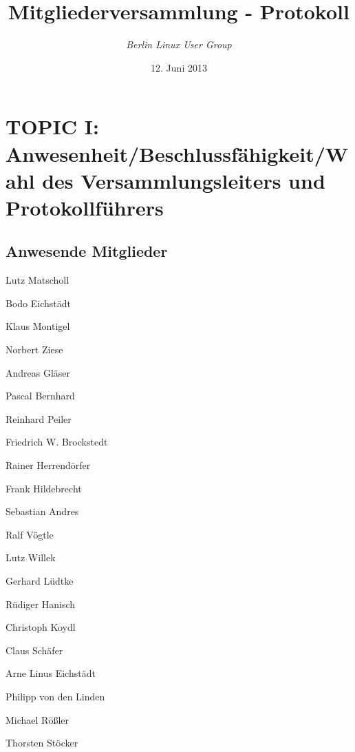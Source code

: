 \documentclass[11pt,a4paper,ngerman]{article}
\title{\textbf{Mitgliederversammlung - Protokoll}}
\author{\emph{Berlin Linux User Group}}
\date{12. Juni 2013}
\begin{document}

\maketitle
\thispagestyle{empty}
\newpage


\setcounter{tocdepth}{2}
\tableofcontents

\newpage




\section{TOPIC I: Anwesenheit/Beschlussfähigkeit/Wahl des Versammlungsleiters 
und Protokollführers}

  \subsection{Anwesende Mitglieder}

    \begin{itemize*}
      \item Lutz Matscholl
      \item Bodo Eichstädt
      \item Klaus Montigel
      \item Norbert Ziese
      \item Andreas Gläser
      \item Pascal Bernhard
      \item Reinhard Peiler
      \item Friedrich W. Brockstedt
      \item Rainer Herrendörfer
      \item Frank Hildebrecht
      \item Sebastian Andres
      \item Ralf Vögtle
      \item Lutz Willek
      \item Gerhard Lüdtke
      \item Rüdiger Hanisch
      \item Christoph Koydl
      \item Claus Schäfer
      \item Arne Linus Eichstädt
      \item Philipp von den Linden
      \item Michael Rößler
      \item Thorsten Stöcker


   \end{itemize*}
\end{document}
